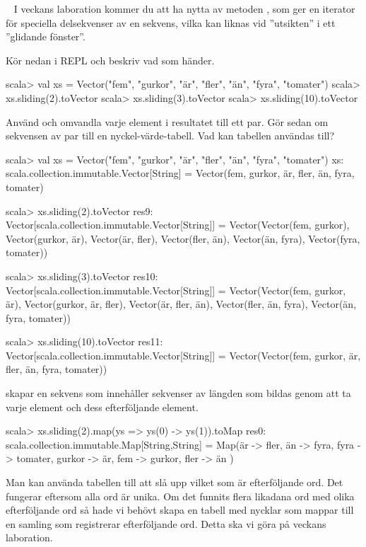 \QUESTEND




\QUESTBEGIN

\Task  \what~  I veckans laboration kommer du att ha nytta av metoden , som ger en iterator för speciella delsekvenser av en sekvens, vilka kan liknas vid ''utsikten'' i ett ''glidande fönster''.

\Subtask Kör nedan i REPL och beskriv vad som händer.

\begin{REPL}
scala> val xs = Vector("fem", "gurkor", "är", "fler", "än", "fyra", "tomater")
scala> xs.sliding(2).toVector
scala> xs.sliding(3).toVector
scala> xs.sliding(10).toVector
\end{REPL}

\Subtask Använd  och omvandla varje element i resultatet till ett par. Gör sedan om sekvensen av par till en nyckel-värde-tabell. Vad kan tabellen användas till?

\SOLUTION

\TaskSolved \what

\SubtaskSolved
\begin{REPL}
scala> val xs = Vector("fem", "gurkor", "är", "fler", "än", "fyra", "tomater")
xs: scala.collection.immutable.Vector[String] =
Vector(fem, gurkor, är, fler, än, fyra, tomater)

scala> xs.sliding(2).toVector
res9: Vector[scala.collection.immutable.Vector[String]] =
Vector(Vector(fem, gurkor), Vector(gurkor, är), Vector(är, fler), Vector(fler, än), Vector(än, fyra), Vector(fyra, tomater))

scala> xs.sliding(3).toVector
res10: Vector[scala.collection.immutable.Vector[String]] =
Vector(Vector(fem, gurkor, är), Vector(gurkor, är, fler), Vector(är, fler, än), Vector(fler, än, fyra), Vector(än, fyra, tomater))

scala> xs.sliding(10).toVector
res11: Vector[scala.collection.immutable.Vector[String]] =
Vector(Vector(fem, gurkor, är, fler, än, fyra, tomater))

\end{REPL}
 skapar en sekvens som innehåller sekvenser av längden  som bildas genom att ta varje element och dess  efterföljande element.

\SubtaskSolved
\begin{REPL}
scala> xs.sliding(2).map(ys => ys(0) -> ys(1)).toMap
res0: scala.collection.immutable.Map[String,String] =
Map(är -> fler,
    än -> fyra,
    fyra -> tomater,
    gurkor -> är,
    fem -> gurkor,
    fler -> än
)
\end{REPL}
Man kan använda tabellen till att slå upp vilket som är efterföljande ord. Det fungerar eftersom alla ord är unika. Om det funnits flera likadana ord med olika efterföljande ord så hade vi behövt skapa en tabell med nycklar som mappar till en samling som registrerar efterföljande ord. Detta ska vi göra på veckans laboration.

